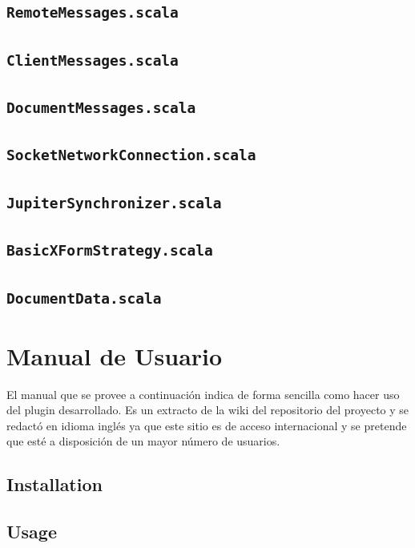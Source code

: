 \documentclass[12pt,a4paper]{article}
\let\stdsection\section
\renewcommand\section{\newpage\stdsection}
\begin{document}
\subsection{\texttt{RemoteMessages.scala}} 
\subsection{\texttt{ClientMessages.scala}} 
\subsection{\texttt{DocumentMessages.scala}} 
\subsection{\texttt{SocketNetworkConnection.scala}} 
\subsection{\texttt{JupiterSynchronizer.scala}} 
\subsection{\texttt{BasicXFormStrategy.scala}} 
\subsection{\texttt{DocumentData.scala}} 


\section{Manual de Usuario}

El manual que se provee a continuación indica de forma sencilla como hacer uso del plugin desarrollado. Es un extracto
de la wiki \cite{wiki-github} del repositorio del proyecto y se redactó en idioma inglés ya que este sitio es de acceso internacional
y se pretende que esté a disposición de un mayor número de usuarios.

\subsection{Installation}


\subsection{Usage}

\end{document}
